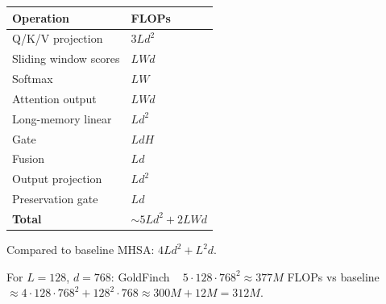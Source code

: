 \begin{table}[H]
\centering
\small
\begin{tabular}{ll}
\toprule
\textbf{Operation} & \textbf{FLOPs} \\
\midrule
Q/K/V projection & $3 L d^2$ \\
Sliding window scores & $L W d$ \\
Softmax & $L W$ \\
Attention output & $L W d$ \\
Long-memory linear & $L d^2$ \\
Gate & $L d H$ \\
Fusion & $L d$ \\
Output projection & $L d^2$ \\
Preservation gate & $L d$ \\
\textbf{Total} & $\sim 5 L d^2 + 2 L W d$ \\
\bottomrule
\end{tabular}
\end{table}

Compared to baseline MHSA: $4 L d^2 + L^2 d$.

For $L = 128$, $d = 768$: GoldFinch ~ $5 \cdot 128 \cdot 768^2 \approx 
377M$ FLOPs vs baseline $\approx 4 \cdot 128 \cdot 768^2 + 128^2 \cdot 768 
\approx 300M + 12M = 312M$.

